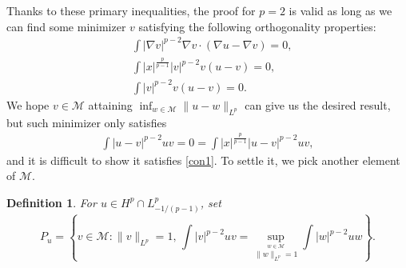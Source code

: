 \documentclass[11pt]{article}
\newtheorem{definition}[theorem]{Definition}
\numberwithin{equation}{section}
\begin{document}
Thanks to these primary inequalities, the proof for $p=2$ is valid as long as we can find some minimizer $v$ satisfying the following orthogonality properties:
\begin{equation}\label{con1}
    \begin{aligned}
        & \int |\nabla v|^{p-2}\nabla v\cdot (\nabla u-\nabla v)=0,\\
        & \int |x|^{\frac{p}{p-1}}|v|^{p-2}v(u-v) =0,\\
        & \int |v|^{p-2}v(u-v)=0.
    \end{aligned}
\end{equation}
We hope $v\in\mathcal{M}$ attaining $\inf_{w\in \mathcal{M}} \|u-w\|_{L^p}$ can give us the desired result, but such minimizer only satisfies
\begin{align*}
    \int |u-v|^{p-2}uv = 0 = \int |x|^{\frac{p}{p-1}}|u-v|^{p-2}uv,
\end{align*}
and it is difficult to show it satisfies \eqref{con1}. To settle it, we pick another element of $\mathcal{M}$.

\begin{definition}
    For $u\in H^p\cap L^p_{-1/(p-1)}$, set
    \begin{equation}\label{def of Pu}
        P_u = \left\{ v\in\mathcal{M} : \|v\|_{L^p}=1,\, \int |v|^{p-2}uv = \sup_{ \stackrel{w\in \mathcal{M}}{\|w\|_{L^p}=1} } \int |w|^{p-2}uw\right\}.
    \end{equation}
\end{definition}
\end{document}
